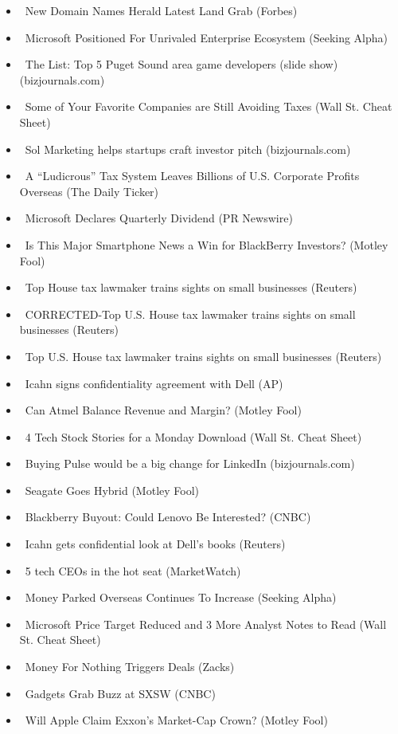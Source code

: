 \documentclass[11pt,asymmetric]{article}
\begin{document}
\begin{itemize}
\item\ New Domain Names Herald Latest Land Grab (Forbes)
\item\ Microsoft Positioned For Unrivaled Enterprise Ecosystem (Seeking Alpha)
\item\ The List: Top 5 Puget Sound area game developers (slide show) (bizjournals.com)
\item\ Some of Your Favorite Companies are Still Avoiding Taxes (Wall St. Cheat Sheet)
\item\ Sol Marketing helps startups craft investor pitch (bizjournals.com)
\item\ A “Ludicrous” Tax System Leaves Billions of U.S. Corporate Profits Overseas (The Daily Ticker)
\item\ Microsoft Declares Quarterly Dividend (PR Newswire)
\item\ Is This Major Smartphone News a Win for BlackBerry Investors? (Motley Fool)
\item\ Top House tax lawmaker trains sights on small businesses (Reuters)
\item\ CORRECTED-Top U.S. House tax lawmaker trains sights on small businesses (Reuters)
\item\ Top U.S. House tax lawmaker trains sights on small businesses (Reuters)
\item\ Icahn signs confidentiality agreement with Dell (AP)
\item\ Can Atmel Balance Revenue and Margin? (Motley Fool)
\item\ 4 Tech Stock Stories for a Monday Download (Wall St. Cheat Sheet)
\item\ Buying Pulse would be a big change for LinkedIn (bizjournals.com)
\item\ Seagate Goes Hybrid (Motley Fool)
\item\ Blackberry Buyout: Could Lenovo Be Interested? (CNBC)
\item\ Icahn gets confidential look at Dell's books (Reuters)
\item\ 5 tech CEOs in the hot seat (MarketWatch)
\item\ Money Parked Overseas Continues To Increase (Seeking Alpha)
\item\ Microsoft Price Target Reduced and 3 More Analyst Notes to Read (Wall St. Cheat Sheet)
\item\ Money For Nothing Triggers Deals (Zacks)
\item\ Gadgets Grab Buzz at SXSW (CNBC)
\item\ Will Apple Claim Exxon's Market-Cap Crown? (Motley Fool)

\end{itemize}
\end{document}
